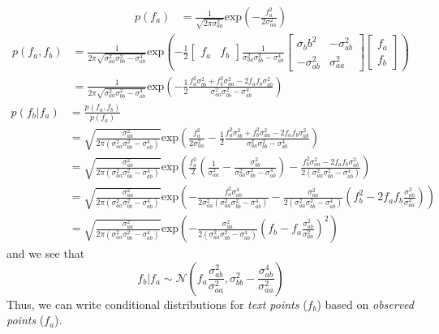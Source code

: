 \documentclass{article}
\begin{document}
\begin{align}
p(f_a) & = \frac{1}{\sqrt{2\pi\sigma^2_{aa}}} \mathrm{exp}\left(-\frac{f_a^2}{2\sigma^2_{aa}} \right)
\end{align}
\begin{align}
p(f_a, f_b) & = \frac{1}{2\pi\sqrt{\sigma^2_{aa}\sigma^2_{bb} - \sigma^4_{ab}}} \mathrm{exp}\left( -\frac{1}{2} \begin{bmatrix} f_a & f_b \end{bmatrix} \frac{1}{\sigma^2_{aa}\sigma^2_{bb} - \sigma^4_{ab}}\begin{bmatrix} \sigma_bb^2 & -\sigma_{ab}^2 \\ -\sigma_{ab}^2 & \sigma_{aa}^2 \end{bmatrix} \begin{bmatrix} f_a \\ f_b \end{bmatrix} \right) \nonumber \\
            & = \frac{1}{2\pi\sqrt{\sigma^2_{aa}\sigma^2_{bb} - \sigma^4_{ab}}} \mathrm{exp}\left( -\frac{1}{2} \frac{f_a^2\sigma_{bb}^2 + f_b^2\sigma_{aa}^2 - 2f_a f_b \sigma_{ab}^2}{\sigma^2_{aa}\sigma^2_{bb} - \sigma^4_{ab}} \right)
\end{align}
\begin{align}
p(f_b|f_a) & = \frac{p(f_a, f_b)}{p(f_a)} \nonumber \\
           & = \sqrt{\frac{\sigma_{aa}^2}{2\pi\left(\sigma_{aa}^2\sigma_{bb}^2 - \sigma_{ab}^4\right)}}\mathrm{exp}\left( \frac{f_a^2}{2\sigma_{aa}^2} - \frac{1}{2} \frac{f_a^2\sigma_{bb}^2 + f_b^2\sigma_{aa}^2 - 2f_a f_b \sigma_{ab}^2}{\sigma^2_{aa}\sigma^2_{bb} - \sigma^4_{ab}}\right) \nonumber \\
           & = \sqrt{\frac{\sigma_{aa}^2}{2\pi\left(\sigma_{aa}^2\sigma_{bb}^2 - \sigma_{ab}^4\right)}}\mathrm{exp}\left( \frac{f_a^2}{2}\left(\frac{1}{\sigma_{aa}^2} - \frac{\sigma_{bb}^2}{\sigma_{aa}^2\sigma_{bb}^2-\sigma_{ab}^4}\right) - \frac{f_b^2 \sigma_{aa}^2 - 2 f_a f_b \sigma_{ab}^2}{2\left(\sigma_{aa}^2\sigma_{bb}^2 - \sigma_{ab}^4\right)}\right) \nonumber \\
           & = \sqrt{\frac{\sigma_{aa}^2}{2\pi\left(\sigma_{aa}^2\sigma_{bb}^2 - \sigma_{ab}^4\right)}}\mathrm{exp}\left( -\frac{f_a^2\sigma_{ab}^4}{2\sigma_{aa}^2\left(\sigma_{aa}^2\sigma_{bb}^2 - \sigma_{ab}^4\right)} - \frac{\sigma_{aa}^2}{2\left(\sigma_{aa}^2\sigma_{bb}^2 - \sigma_{ab}^4\right)}\left(f_b^2 - 2f_af_b\frac{\sigma_{ab}^2}{\sigma_{aa}^2}\right)\right) \nonumber \\
           & = \sqrt{\frac{\sigma_{aa}^2}{2\pi\left(\sigma_{aa}^2\sigma_{bb}^2 - \sigma_{ab}^4\right)}}\mathrm{exp}\left( - \frac{\sigma_{aa}^2}{2\left(\sigma_{aa}^2\sigma_{bb}^2 - \sigma_{ab}^4\right)} \left(f_b - f_a\frac{\sigma_{ab}^2}{\sigma_{aa}^2}\right)^2 \right)
\end{align}
and we see that
\begin{equation}
 f_b|f_a \sim \mathcal{N}\left(f_a\frac{\sigma_{ab}^2}{\sigma_{aa}^2}, \sigma_{bb}^2 - \frac{\sigma_{ab}^4}{\sigma_{aa}^2}\right)
\end{equation}
Thus, we can write conditional distributions for \textit{text points} ($f_b$) based on \textit{observed points} ($f_a$).
\end{document}
